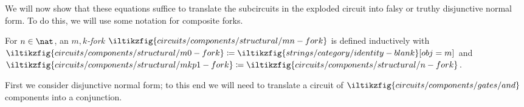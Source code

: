 

We will now show that these equations suffice to translate the subcircuits in
the exploded circuit into falsy or truthy disjunctive normal form.
To do this, we will use some notation for composite forks.

\begin{definition}\label{def:mk-fork}
    For \(n \in \nat\), an \emph{\(m,k\)-fork}
    \(\iltikzfig{circuits/components/structural/mn-fork}\)
    is defined
    inductively with \(
    \iltikzfig{circuits/components/structural/m0-fork} \coloneqq
    \iltikzfig{strings/category/identity-blank}[obj=m]
    \) and \(
    \iltikzfig{circuits/components/structural/mkp1-fork} \coloneqq
    \iltikzfig{circuits/components/structural/n-fork}
    \).
\end{definition}

First we consider disjunctive normal form; to this end we will need to translate
a circuit of \(\iltikzfig{circuits/components/gates/and}\) components into a
conjunction.

